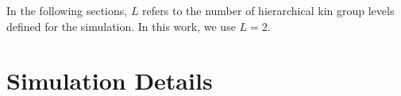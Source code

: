 

\clearpage
\dissertationexclude{\onecolumn}



\clearpage
\dissertationexclude{\twocolumn}






% 


In the following sections, $L$ refers to the number of hierarchical kin group levels defined for the simulation.
In this work, we use $L=2$.






\section{Simulation Details}
\label{sec:simulation-details}

\newenvironment{leveldown}%
  {\let\section\subsection%
   \let\subsection\subsubsection%
   \let\subsubsection\paragraph%
   \let\paragraph\subparagraph%
  }{}


